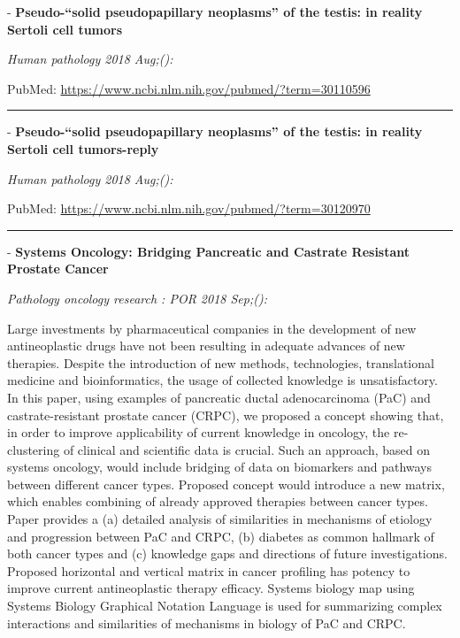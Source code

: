 \documentclass[]{article}
\begin{document}
 - \textbf{Pseudo-``solid pseudopapillary neoplasms'' of the testis: in
reality Sertoli cell tumors}

\emph{Human pathology 2018 Aug;():}

PubMed: \url{https://www.ncbi.nlm.nih.gov/pubmed/?term=30110596}

{}

{}

\begin{center}\rule{0.5\linewidth}{\linethickness}\end{center}

 - \textbf{Pseudo-``solid pseudopapillary neoplasms'' of the testis: in
reality Sertoli cell tumors-reply}

\emph{Human pathology 2018 Aug;():}

PubMed: \url{https://www.ncbi.nlm.nih.gov/pubmed/?term=30120970}

{}

{}

\begin{center}\rule{0.5\linewidth}{\linethickness}\end{center}

 - \textbf{Systems Oncology: Bridging Pancreatic and Castrate Resistant
Prostate Cancer}

\emph{Pathology oncology research : POR 2018 Sep;():}

Large investments by pharmaceutical companies in the development of new
antineoplastic drugs have not been resulting in adequate advances of new
therapies. Despite the introduction of new methods, technologies,
translational medicine and bioinformatics, the usage of collected
knowledge is unsatisfactory. In this paper, using examples of pancreatic
ductal adenocarcinoma (PaC) and castrate-resistant prostate cancer
(CRPC), we proposed a concept showing that, in order to improve
applicability of current knowledge in oncology, the re-clustering of
clinical and scientific data is crucial. Such an approach, based on
systems oncology, would include bridging of data on biomarkers and
pathways between different cancer types. Proposed concept would
introduce a new matrix, which enables combining of already approved
therapies between cancer types. Paper provides a (a) detailed analysis
of similarities in mechanisms of etiology and progression between PaC
and CRPC, (b) diabetes as common hallmark of both cancer types and (c)
knowledge gaps and directions of future investigations. Proposed
horizontal and vertical matrix in cancer profiling has potency to
improve current antineoplastic therapy efficacy. Systems biology map
using Systems Biology Graphical Notation Language is used for
summarizing complex interactions and similarities of mechanisms in
biology of PaC and CRPC.
\end{document}
